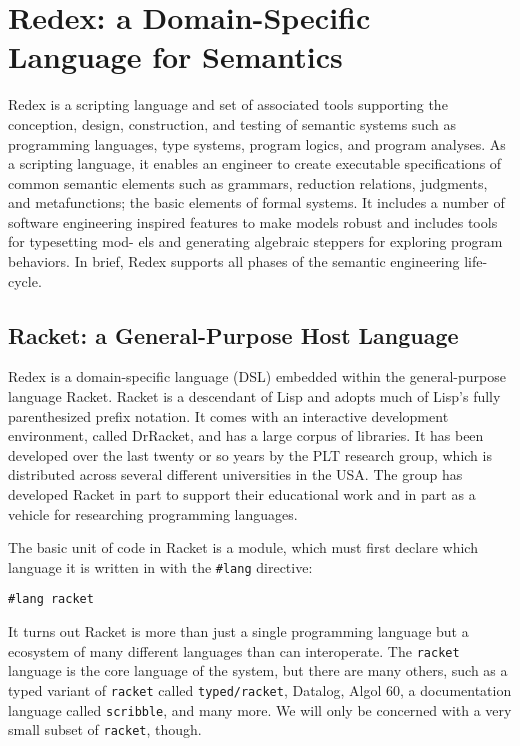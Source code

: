 \section{Redex: a Domain-Specific Language for Semantics}

Redex is a scripting language and set of associated tools supporting
the conception, design, construction, and testing of semantic systems
such as programming languages, type systems, program logics, and
program analyses. As a scripting language, it enables an engineer to
create executable specifications of common semantic elements such as
grammars, reduction relations, judgments, and metafunctions; the basic
elements of formal systems. It includes a number of software
engineering inspired features to make models robust and includes tools
for typesetting mod- els and generating algebraic steppers for
exploring program behaviors. In brief, Redex supports all phases of
the semantic engineering life-cycle.

\subsection{Racket: a General-Purpose Host Language}

Redex is a domain-specific language (DSL) embedded within the
general-purpose language Racket.  Racket is a descendant of Lisp and
adopts much of Lisp's fully parenthesized prefix notation.  It comes
with an interactive development environment, called DrRacket, and has
a large corpus of libraries.  It has been developed over the last
twenty or so years by the PLT research group, which is distributed
across several different universities in the USA.  The group has
developed Racket in part to support their educational work and in part
as a vehicle for researching programming languages.

The basic unit of code in Racket is a module, which must first declare
which language it is written in with the {\tt \#lang} directive:
\begin{verbatim}
#lang racket
\end{verbatim}
It turns out Racket is more than just a single programming language
but a ecosystem of many different languages than can interoperate.
The {\tt racket} language is the core language of the system, but
there are many others, such as a typed variant of {\tt racket} called
{\tt typed/racket}, Datalog, Algol 60, a documentation language called
{\tt scribble}, and many more.  We will only be concerned with a very
small subset of {\tt racket}, though.


